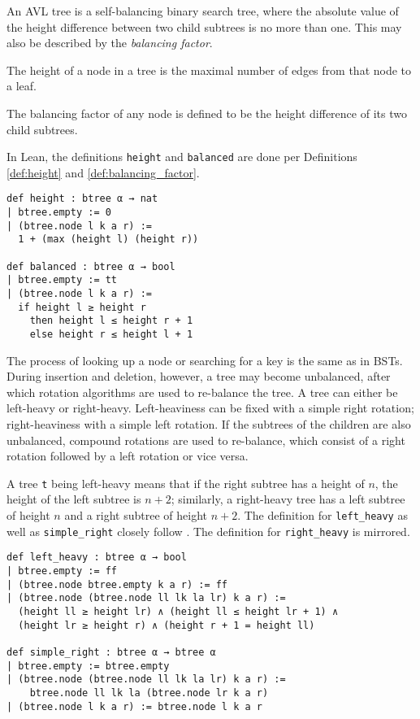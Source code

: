 An AVL tree \cite{avl:original} is a self-balancing binary search tree, where the absolute value of the height difference between two child subtrees is no more than one.
This may also be described by the \textit{balancing factor}.

\begin{definition}
  \label{def:height}
  The height of a node in a tree is the maximal number of edges from that node to a leaf.
\end{definition}

\begin{definition}
  \label{def:balancing_factor}
  The balancing factor of any node is defined to be the height difference of its two child subtrees.
\end{definition}

In Lean, the definitions \lstinline{height} and \lstinline{balanced} are done per Definitions \ref{def:height} and \ref{def:balancing_factor}.

\begin{lstlisting}
def height : btree α → nat
| btree.empty := 0
| (btree.node l k a r) :=
  1 + (max (height l) (height r))

def balanced : btree α → bool
| btree.empty := tt
| (btree.node l k a r) :=
  if height l ≥ height r 
    then height l ≤ height r + 1
    else height r ≤ height l + 1
\end{lstlisting}

The process of looking up a node or searching for a key is the same as in BSTs. During insertion and deletion, however, a tree may become unbalanced, after which rotation algorithms are used to re-balance the tree. A tree can either be left-heavy or right-heavy. Left-heaviness can be fixed with a simple right rotation; right-heaviness with a simple left rotation. If the subtrees of the children are also unbalanced, compound rotations are used to re-balance, which consist of a right rotation followed by a left rotation or vice versa.

A tree \lstinline{t} being left-heavy means that if the right subtree has a height of $n$, the height of the left subtree is $n+2$; similarly, a right-heavy tree has a left subtree of height $n$ and a right subtree of height $n+2$. The definition for \lstinline{left_heavy} as well as \lstinline{simple_right} closely follow \cite{textbook:discrete_computer}. The definition for \lstinline{right_heavy} is mirrored.

\begin{lstlisting}
def left_heavy : btree α → bool
| btree.empty := ff
| (btree.node btree.empty k a r) := ff
| (btree.node (btree.node ll lk la lr) k a r) :=
  (height ll ≥ height lr) ∧ (height ll ≤ height lr + 1) ∧
  (height lr ≥ height r) ∧ (height r + 1 = height ll)

def simple_right : btree α → btree α
| btree.empty := btree.empty
| (btree.node (btree.node ll lk la lr) k a r) := 
    btree.node ll lk la (btree.node lr k a r)
| (btree.node l k a r) := btree.node l k a r
\end{lstlisting}

